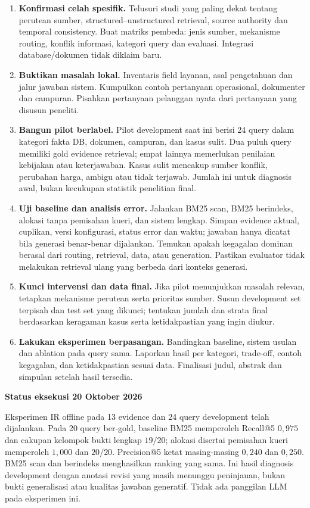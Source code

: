 \documentclass[11pt,a4paper]{article}
\newcommand{\subheading}[1]{\vspace{3pt}\textbf{#1}\par}
\begin{document}
\begin{enumerate}
\item \textbf{Konfirmasi celah spesifik.} Telusuri studi yang paling dekat tentang perutean sumber, structured--unstructured retrieval, source authority dan temporal consistency. Buat matriks pembeda: jenis sumber, mekanisme routing, konflik informasi, kategori query dan evaluasi. Integrasi database/dokumen tidak diklaim baru.
\item \textbf{Buktikan masalah lokal.} Inventaris field layanan, asal pengetahuan dan jalur jawaban sistem. Kumpulkan contoh pertanyaan operasional, dokumenter dan campuran. Pisahkan pertanyaan pelanggan nyata dari pertanyaan yang disusun peneliti.
\item \textbf{Bangun pilot berlabel.} Pilot development saat ini berisi 24 query dalam kategori fakta DB, dokumen, campuran, dan kasus sulit. Dua puluh query memiliki gold evidence retrieval; empat lainnya memerlukan penilaian kebijakan atau keterjawaban. Kasus sulit mencakup sumber konflik, perubahan harga, ambigu atau tidak terjawab. Jumlah ini untuk diagnosis awal, bukan kecukupan statistik penelitian final.
\item \textbf{Uji baseline dan analisis error.} Jalankan BM25 scan, BM25 berindeks, alokasi tanpa pemisahan kueri, dan sistem lengkap. Simpan evidence aktual, cuplikan, versi konfigurasi, status error dan waktu; jawaban hanya dicatat bila generasi benar-benar dijalankan. Temukan apakah kegagalan dominan berasal dari routing, retrieval, data, atau generation. Pastikan evaluator tidak melakukan retrieval ulang yang berbeda dari konteks generasi.
\item \textbf{Kunci intervensi dan data final.} Jika pilot menunjukkan masalah relevan, tetapkan mekanisme perutean serta prioritas sumber. Susun development set terpisah dan test set yang dikunci; tentukan jumlah dan strata final berdasarkan keragaman kasus serta ketidakpastian yang ingin diukur.
\item \textbf{Lakukan eksperimen berpasangan.} Bandingkan baseline, sistem usulan dan ablation pada query sama. Laporkan hasil per kategori, trade-off, contoh kegagalan, dan ketidakpastian sesuai data. Finalisasi judul, abstrak dan simpulan setelah hasil tersedia.
\end{enumerate}

\subheading{Status eksekusi 20 Oktober 2026}
Eksperimen IR offline pada 13 evidence dan 24 query development telah dijalankan. Pada 20 query ber-gold, baseline BM25 memperoleh Recall@5 $0{,}975$ dan cakupan kelompok bukti lengkap $19/20$; alokasi disertai pemisahan kueri memperoleh $1{,}000$ dan $20/20$. Precision@5 ketat masing-masing $0{,}240$ dan $0{,}250$. BM25 scan dan berindeks menghasilkan ranking yang sama. Ini hasil diagnosis development dengan anotasi revisi yang masih menunggu peninjauan, bukan bukti generalisasi atau kualitas jawaban generatif. Tidak ada panggilan LLM pada eksperimen ini.
\end{document}
